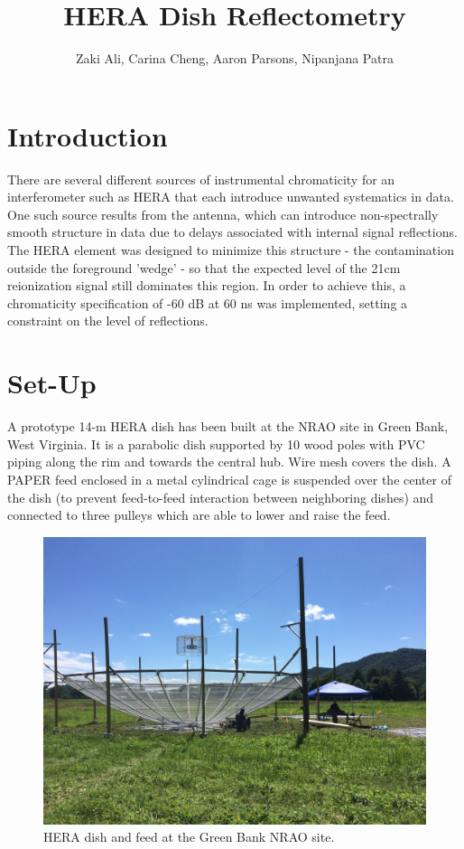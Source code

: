 \documentclass[12pt,preprint]{aastex}
\begin{document}
\title{HERA Dish Reflectometry} 
\author{Zaki Ali, Carina Cheng, Aaron Parsons, Nipanjana Patra}
\maketitle

\section{Introduction}

There are several different sources of instrumental chromaticity for an interferometer such as HERA that each introduce unwanted systematics in data. One such source results from the antenna, which can introduce non-spectrally smooth structure in data due to delays associated with internal signal reflections. The HERA element was designed to minimize this structure - the contamination outside the foreground 'wedge' - so that the expected level of the 21cm reionization signal still dominates this region. In order to achieve this, a chromaticity specification of -60 dB at 60 ns was implemented, setting a constraint on the level of reflections.


\section{Set-Up}

A prototype 14-m HERA dish has been built at the NRAO site in Green Bank, West Virginia. It is a parabolic dish supported by 10 wood poles with PVC piping along the rim and towards the central hub. Wire mesh covers the dish. A PAPER feed enclosed in a metal cylindrical cage is suspended over the center of the dish (to prevent feed-to-feed interaction between neighboring dishes) and connected to three pulleys which are able to lower and raise the feed. 

\begin{figure}
\centering
\includegraphics[trim={2cm 20cm 30cm 15cm},clip, totalheight=0.45\textheight]{plots/heradish.jpg}
\caption{HERA dish and feed at the Green Bank NRAO site.}
\end{figure}
\end{document}
